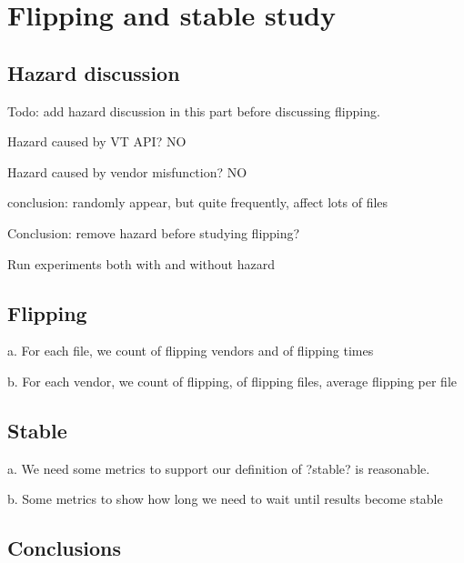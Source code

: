 \section{Flipping and stable study}

\subsection{Hazard discussion}

Todo: add hazard discussion in this part before discussing flipping. 

Hazard caused by VT API? NO

Hazard caused by vendor misfunction? NO

conclusion: randomly appear, but quite frequently, affect lots of files

Conclusion: remove hazard before studying flipping?

Run experiments both with and without hazard

\subsection{Flipping}
a. For each file, we count  of flipping vendors and  of flipping times

b. For each vendor, we count  of flipping,  of flipping files, average flipping per file

\subsection{Stable}
a. We need some metrics to support our definition of ?stable? is reasonable.

b. Some metrics to show how long we need to wait until results become stable

\subsection{Conclusions}
